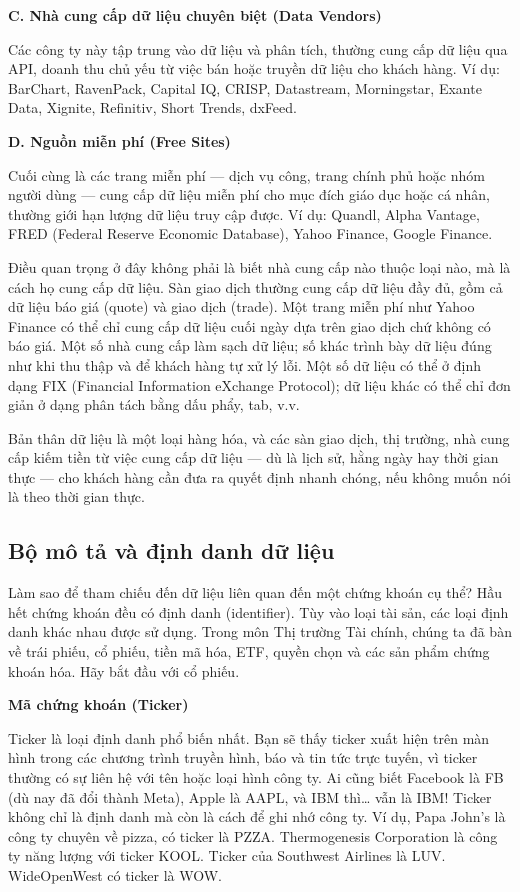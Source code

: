 \textbf{C. Nhà cung cấp dữ liệu chuyên biệt (Data Vendors)}

Các công ty này tập trung vào dữ liệu và phân tích, thường cung cấp dữ liệu qua API, doanh thu chủ yếu từ việc bán hoặc truyền dữ liệu cho khách hàng. Ví dụ: BarChart, RavenPack, Capital IQ, CRISP, Datastream, Morningstar, Exante Data, Xignite, Refinitiv, Short Trends, dxFeed.

\textbf{D. Nguồn miễn phí (Free Sites)}

Cuối cùng là các trang miễn phí — dịch vụ công, trang chính phủ hoặc nhóm người dùng — cung cấp dữ liệu miễn phí cho mục đích giáo dục hoặc cá nhân, thường giới hạn lượng dữ liệu truy cập được. Ví dụ: Quandl, Alpha Vantage, FRED (Federal Reserve Economic Database), Yahoo Finance, Google Finance.

Điều quan trọng ở đây không phải là biết nhà cung cấp nào thuộc loại nào, mà là cách họ cung cấp dữ liệu. Sàn giao dịch thường cung cấp dữ liệu đầy đủ, gồm cả dữ liệu báo giá (quote) và giao dịch (trade). Một trang miễn phí như Yahoo Finance có thể chỉ cung cấp dữ liệu cuối ngày dựa trên giao dịch chứ không có báo giá. Một số nhà cung cấp làm sạch dữ liệu; số khác trình bày dữ liệu đúng như khi thu thập và để khách hàng tự xử lý lỗi. Một số dữ liệu có thể ở định dạng FIX (Financial Information eXchange Protocol); dữ liệu khác có thể chỉ đơn giản ở dạng phân tách bằng dấu phẩy, tab, v.v.

Bản thân dữ liệu là một loại hàng hóa, và các sàn giao dịch, thị trường, nhà cung cấp kiếm tiền từ việc cung cấp dữ liệu — dù là lịch sử, hằng ngày hay thời gian thực — cho khách hàng cần đưa ra quyết định nhanh chóng, nếu không muốn nói là theo thời gian thực.

\subsection{Bộ mô tả và định danh dữ liệu}

Làm sao để tham chiếu đến dữ liệu liên quan đến một chứng khoán cụ thể? Hầu hết chứng khoán đều có định danh (identifier). Tùy vào loại tài sản, các loại định danh khác nhau được sử dụng. Trong môn Thị trường Tài chính, chúng ta đã bàn về trái phiếu, cổ phiếu, tiền mã hóa, ETF, quyền chọn và các sản phẩm chứng khoán hóa. Hãy bắt đầu với cổ phiếu.

\textbf{Mã chứng khoán (Ticker)}

Ticker là loại định danh phổ biến nhất. Bạn sẽ thấy ticker xuất hiện trên màn hình trong các chương trình truyền hình, báo và tin tức trực tuyến, vì ticker thường có sự liên hệ với tên hoặc loại hình công ty. Ai cũng biết Facebook là FB (dù nay đã đổi thành Meta), Apple là AAPL, và IBM thì… vẫn là IBM! Ticker không chỉ là định danh mà còn là cách để ghi nhớ công ty. Ví dụ, Papa John's là công ty chuyên về pizza, có ticker là PZZA. Thermogenesis Corporation là công ty năng lượng với ticker KOOL. Ticker của Southwest Airlines là LUV. WideOpenWest có ticker là WOW.

